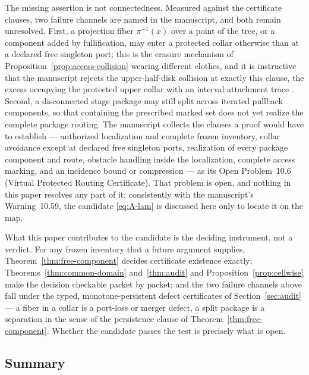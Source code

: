 The missing assertion is not connectedness.  Measured against the
certificate clauses, two failure channels are named in the manuscript,
and both remain unresolved.  First, a projection fiber
$\pi^{-1}(x)$ over a point of the tree, or a component added by
fullification, may enter a protected collar otherwise than at a declared
free singleton port; this is the erasure mechanism of
Proposition~\ref{prop:access-collision} wearing different clothes, and
it is instructive that the manuscript rejects the upper-half-disk
collision at exactly this clause, the excess occupying the protected
upper collar with an interval attachment trace \cite{MWman}.  Second, a
disconnected stage package may still split across iterated pullback
components, so that containing the prescribed marked set does not yet realize
the complete package routing.  The manuscript collects the clauses a
proof would have to establish --- authorized localization and complete
frozen inventory, collar avoidance except at declared free singleton
ports, realization of every package component and route, obstacle
handling inside the localization, complete access marking, and an
incidence bound or compression --- as its Open Problem~10.6 (Virtual
Protected Routing Certificate).  That problem is open, and nothing in
this paper resolves any part of it; consistently with the manuscript's
Warning~10.59, the candidate \eqref{eq:A-lam} is discussed here only to
locate it on the map.

What this paper contributes to the candidate is the deciding instrument,
not a verdict.  For any frozen inventory that a future argument
supplies, Theorem~\ref{thm:free-component} decides certificate existence
exactly; Theorems~\ref{thm:common-domain} and~\ref{thm:audit} and
Proposition~\ref{prop:cellwise} make the decision checkable packet by
packet; and the two failure channels above fall under the typed,
monotone-persistent defect certificates of Section~\ref{sec:audit} ---
a fiber in a collar is a port-loss or merger defect, a split package is
a separation in the sense of the persistence clause of
Theorem~\ref{thm:free-component}.  Whether the candidate passes the test
is precisely what is open.

\subsection{Summary}
\label{subsec:A-comp-summary}

